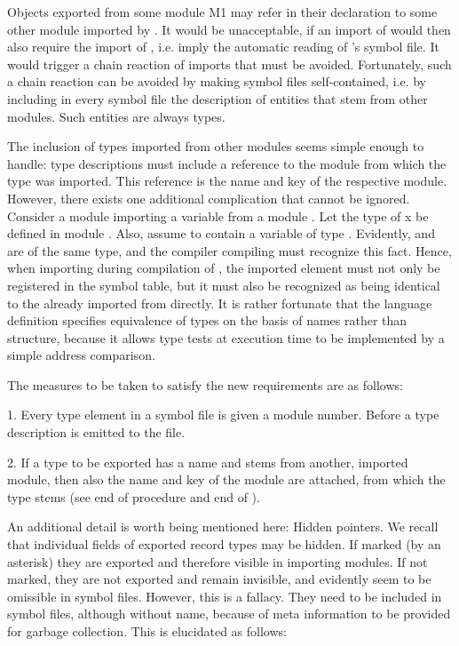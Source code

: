Objects exported from some module M1 may refer in their declaration to some other module  imported by . It would be unacceptable, if an import of  would then also require the import of , i.e. imply the automatic reading of 's symbol file. It would trigger a chain reaction of imports that must be avoided. Fortunately, such a chain reaction can be avoided by making symbol files self-contained, i.e. by including in every symbol file the description of entities that stem from other modules. Such entities are always types.

The inclusion of types imported from other modules seems simple enough to handle: type descriptions must include a reference to the module from which the type was imported. This reference is the name and key of the respective module. However, there exists one additional complication that cannot be ignored. Consider a module  importing a variable  from a module . Let the type  of x be defined in module . Also, assume  to contain a variable  of type . Evidently,  and  are of the same type, and the compiler compiling  must recognize this fact. Hence, when importing  during compilation of , the imported element  must not only be registered in the symbol table, but it must also be recognized as being identical to the  already imported from  directly. It is rather fortunate that the language definition specifies equivalence of types on the basis of names rather than structure, because it allows type tests at execution time to be implemented by a simple address comparison.

The measures to be taken to satisfy the new requirements are as follows:

\item{1.} Every type element in a symbol file is given a module number. Before a type description is emitted to the file.
\item{2.} If a type to be exported has a name and stems from another, imported module, then also the name and key of the module are attached, from which the type stems (see end of procedure  and end of ).

An additional detail is worth being mentioned here: Hidden pointers. We recall that individual fields of exported record types may be hidden. If marked (by an asterisk) they are exported and therefore visible in importing modules. If not marked, they are not exported and remain invisible, and evidently seem to be omissible in symbol files. However, this is a fallacy. They need to be included in symbol files, although without name, because of meta information to be provided for garbage collection. This is elucidated as follows:

